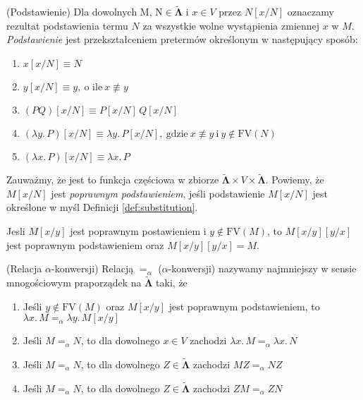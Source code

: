 \begin{definicja}(Podstawienie)\label{def:substitution}
Dla dowolnych \(\mathrm{M,\,N}\in\mathbf{\tilde\Lambda}\) i \(x\in V\) przez \(N[x/N]\) oznaczamy rezultat podstawienia termu \(N\) za wszystkie wolne wystąpienia zmiennej \(x\) w \(M\). \emph{Podstawienie} jest przekształceniem pretermów określonym w następujący sposób:
  \begin{enumerate}[label={(\alph*)}, ref={(\arabic*)}]
    \setlength\itemsep{0em}
    \item \(x[x/N] \equiv N\)
    \item \(y[x/N] \equiv y,\ \text{o ile}\ x\not\equiv y\)
    \item \((PQ)[x/N] \equiv P[x/N]\,Q[x/N]\)
    \item \((\lambda y.\, P)[x/N] \equiv \lambda y.\,P[x/N],\ \text{gdzie}\ x\not\equiv y\ \text{i}\ y\not\in \mathrm{FV}(N)\)
    \item \((\lambda x.\, P)[x/N] \equiv \lambda x.\,P\)
  \end{enumerate}
  Zauważmy, że jest to funkcja częściowa w zbiorze \(\mathbf{\tilde\Lambda}\times V \times \mathbf{\tilde\Lambda}\). Powiemy, że \(M[x/N]\) jest \emph{poprawnym podstawieniem}, jeśli podstawienie \(M[x/N]\) jest określone w myśl Definicji \ref{def:substitution}. 
\end{definicja}

\begin{fakt}\label{def:odwracalnosc_podstawienia}
Jesli \(M[x/y]\) jest poprawnym postawieniem i \(y\not\in\mathrm{FV}(M)\), to \(M[x/y][y/x]\) jest poprawnym podstawieniem oraz
  \(M[x/y][y/x]=M\).
\begin{dowod}
  \cite{Urzyczyn2006}
\end{dowod}
\end{fakt}

\begin{definicja}(Relacja \(\alpha\)-konwersji)
  Relacją \(=_{\alpha}\) (\(\alpha\)-konwersji) nazywamy najmniejszy w sensie mnogościowym praporządek na \(\mathbf{\tilde\Lambda}\) taki, że
  \begin{enumerate}[label={(\(\alpha\)\arabic*)}, ref={(\(\alpha\)\arabic*)}]
  \setlength\itemsep{0em}
  \item Jeśli \(y\not\in \mathrm{FV}(M)\) oraz \(M[x/y]\) jest poprawnym podstawieniem, to \(\lambda x.\,M =_{\alpha} \lambda y.\,M[x/y]\)
  \item Jeśli \(M=_{\alpha} N\), to dla dowolnego \(x\in V\) zachodzi \(\lambda x.\,M =_{\alpha} \lambda x.\,N\)
  \item Jeśli \(M=_{\alpha} N\), to dla dowolnego \(Z\in\mathbf{\tilde\Lambda}\) zachodzi \(MZ =_{\alpha} NZ\)
  \item Jeśli \(M=_{\alpha} N\), to dla dowolnego \(Z\in\mathbf{\tilde\Lambda}\) zachodzi \(ZM =_{\alpha} ZN\)
  \end{enumerate}
\end{definicja}

